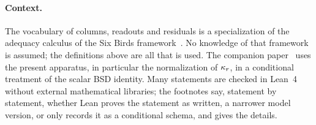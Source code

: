 \paragraph{Context.}
The vocabulary of columns, readouts and residuals is a specialization of
the adequacy calculus of the Six Birds
framework~\citep{TsiokosNeedles2026,TsiokosFoundationsII2026,TsiokosFoundationsIII2026}.
No knowledge of that framework is assumed; the definitions above are all
that is used.  The companion paper~\citep{TsiokosBSDClosure2026} uses the
present apparatus, in particular the normalization of $\kappa_r$, in a
conditional treatment of the scalar BSD identity.  Many statements are
checked in Lean~4 without external mathematical libraries; the footnotes
say, statement by statement, whether Lean proves the statement as written,
a narrower model version, or only records it as a conditional schema, and
 gives the details.

